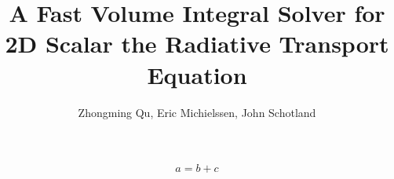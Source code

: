 
\usepackage{subfiles} 
\usepackage{hyperref}
\usepackage{xr}

\title{A Fast Volume Integral Solver for 2D Scalar the Radiative Transport Equation}
\author{Zhongming Qu, Eric Michielssen, John Schotland}

\maketitle




\begin{equation} \label{eq:a}
	a=b+c
\end{equation}



 
